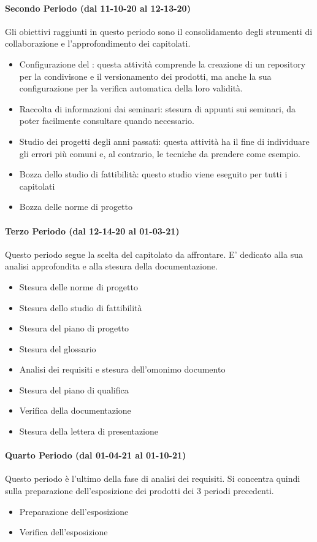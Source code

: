 \paragraph{Secondo Periodo (dal 11-10-20 al 12-13-20)}
Gli obiettivi raggiunti in questo periodo sono il consolidamento degli strumenti di collaborazione e l'approfondimento dei capitolati.
\begin{itemize}
	\item Configurazione del : questa attività comprende la creazione di un repository per la condivisone e il versionamento dei prodotti, ma anche la sua configurazione per la verifica automatica della loro validità.
	\item Raccolta di informazioni dai seminari: stesura di appunti sui seminari, da poter facilmente consultare quando necessario.
	\item Studio dei progetti degli anni passati: questa attività ha il fine di individuare gli errori più comuni e, al contrario, le tecniche da prendere come esempio.
	\item Bozza dello studio di fattibilità: questo studio viene eseguito per tutti i capitolati
	\item Bozza delle norme di progetto
\end{itemize}

\paragraph{Terzo Periodo (dal 12-14-20 al 01-03-21)}
Questo periodo segue la scelta del capitolato da affrontare. E' dedicato alla sua analisi approfondita e alla stesura della documentazione. 
\begin{itemize}
	\item Stesura delle norme di progetto
	\item Stesura dello studio di fattibilità
	\item Stesura del piano di progetto
	\item Stesura del glossario
	\item Analisi dei requisiti e stesura dell'omonimo documento
	\item Stesura del piano di qualifica
	\item Verifica della documentazione
	\item Stesura della lettera di presentazione
\end{itemize}

\paragraph{Quarto Periodo (dal 01-04-21 al 01-10-21)}
Questo periodo è l'ultimo della fase di analisi dei requisiti. Si concentra quindi sulla preparazione dell'esposizione dei prodotti dei 3 periodi precedenti.
\begin{itemize}
	\item Preparazione dell'esposizione
	\item Verifica dell'esposizione
\end{itemize}


